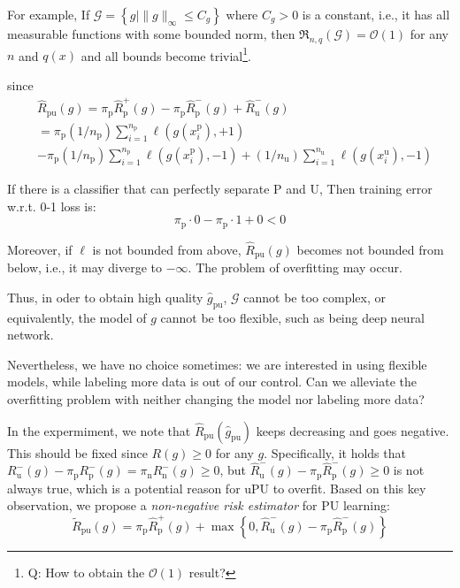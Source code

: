 \documentclass[12pt]{article}
\theoremstyle{definition}
\begin{document}
For example, If $\mathcal{G}=\left\{g |\|g\|_{\infty} \leq C_{g}\right\}$ where $C_{g}>0$ is a constant, i.e., it has all measurable functions with some bounded norm, then $\mathfrak{R}_{n, q}(\mathcal{G})=\mathcal{O}(1)$  for any $n$ and $q(x)$ and all bounds become trivial\footnote{Q: How to obtain the $\mathcal{O}(1)$  result? }.

since 
\begin{equation*}
\begin{aligned}
  	&\widehat{R}_{\mathrm{pu}}(g)
  	=\pi_{\mathrm{p}} \widehat{R}_{\mathrm{p}}^{+}(g)-\pi_{\mathrm{p}} \widehat{R}_{\mathrm{p}}^{-}(g)+\widehat{R}_{\mathrm{u}}^{-}(g)\\
  &=\pi_\mathrm{p}\left(1 / n_{\mathrm{p}}\right) \sum_{i=1}^{n_{\mathrm{p}}} \ell\left(g\left(x_{i}^{\mathrm{p}}\right),+1\right)\\
  &-\pi_\mathrm{p}\left(1 / n_{\mathrm{p}}\right) \sum_{i=1}^{n_{\mathrm{p}}} \ell\left(g\left(x_{i}^{\mathrm{p}}\right),-1\right)
  +\left(1 / n_{\mathrm{u}}\right) \sum_{i=1}^{n_{\mathrm{u}}} \ell\left(g\left(x_{i}^{\mathrm{u}}\right),-1\right)
\end{aligned}
\end{equation*}

 If there is a classifier that can perfectly separate P and U, Then training error w.r.t. 0-1 loss is:
 $$\pi_{\mathrm{p}}\cdot 0 -\pi_{\mathrm{p}}\cdot 1 + 0 <0$$
 
 Moreover, if $\ell$ is not bounded from above, $\widehat{R}_{\mathrm{pu}}(g)$ becomes not bounded from  below, i.e., it may diverge to $-\infty$.  The problem of overfitting may occur.
 
 Thus, in oder to obtain high quality $\widehat{g}_{\mathrm{pu}}$, $\mathcal{G}$ cannot be too complex, or equivalently, the model of $g$ cannot be too flexible, such as being deep neural network.
 
 Nevertheless, we have no choice sometimes: we are interested in using flexible models, while labeling more data is out of our control. Can we alleviate the overfitting problem with neither changing the model nor labeling more data?
 
 In the expermiment, we note that $\widehat{R}_{\mathrm{pu}}\left(\widehat{g}_{\mathrm{pu}}\right)$ keeps decreasing and goes negative. This should be fixed since $R(g)\ge 0$ for any $g$. Specifically, it holds that $R_{\mathrm{u}}^{-}(g)-\pi_{\mathrm{p}} R_{\mathrm{p}}^{-}(g)=\pi_{\mathrm{n}} R_{\mathrm{n}}^{-}(g) \geq 0$, but $\widehat{R}_{\mathrm{u}}^{-}(g)-\pi_{\mathrm{p}} \widehat{R}_{\mathrm{p}}^{-}(g) \geq 0$ is not always true, which is a potential reason for uPU to overfit. Based on this key observation, we propose a \emph{non-negative risk estimator} for PU learning:
 \begin{equation}
 \widetilde{R}_{\mathrm{pu}}(g)=\pi_{\mathrm{p}} \widehat{R}_{\mathrm{p}}^{+}(g)+\max \left\{0, \widehat{R}_{\mathrm{u}}^{-}(g)-\pi_{\mathrm{p}} \widehat{R}_{\mathrm{p}}^{-}(g)\right\}
 \end{equation}
 
\end{document}
